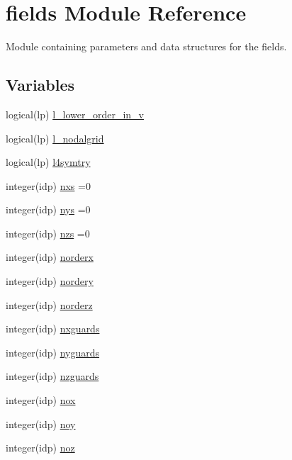 \hypertarget{namespacefields}{}\section{fields Module Reference}
\label{namespacefields}


Module containing parameters and data structures for the fields.  


\subsection*{Variables}
\begin{DoxyCompactItemize}
\item 
logical(lp) \hyperlink{namespacefields_a67f662f46bba94ac18562e7812803f57}{l\+\_\+lower\+\_\+order\+\_\+in\+\_\+v}
\item 
logical(lp) \hyperlink{namespacefields_a9ea1f27108bfb1c1e85280d56cf8ec3f}{l\+\_\+nodalgrid}
\item 
logical(lp) \hyperlink{namespacefields_a12122e98c83fda712ad6b5acfc9d8e0d}{l4symtry}
\item 
integer(idp) \hyperlink{namespacefields_a930a275ec3d0c2c725a19a016cf140f0}{nxs} =0
\item 
integer(idp) \hyperlink{namespacefields_adc125104f8f7666c683e307ad9703412}{nys} =0
\item 
integer(idp) \hyperlink{namespacefields_aa0a3c8b650acfd6add1cfe59383b4b0e}{nzs} =0
\item 
integer(idp) \hyperlink{namespacefields_a5db7070b5dbdeed3416e2ab8405978ef}{norderx}
\item 
integer(idp) \hyperlink{namespacefields_a9f1111bb7c59399b756f2fcb13db9285}{nordery}
\item 
integer(idp) \hyperlink{namespacefields_a1ed7522a1b4a7bc6460525f798d1619e}{norderz}
\item 
integer(idp) \hyperlink{namespacefields_a4ac76b76df65c6d646d63da6b1cd642c}{nxguards}
\item 
integer(idp) \hyperlink{namespacefields_ad86b91ec6fa696f154aebb594c867bf2}{nyguards}
\item 
integer(idp) \hyperlink{namespacefields_a08a746304a8f4b59076abee85eb82642}{nzguards}
\item 
integer(idp) \hyperlink{namespacefields_a9a721e4dba76280df41937c60a91e390}{nox}
\item 
integer(idp) \hyperlink{namespacefields_ae0f614311e278825c771b1b6fa3d0596}{noy}
\item 
integer(idp) \hyperlink{namespacefields_a30badcbccf6fb02a7301a38cb9d27eff}{noz}

\end{DoxyCompactItemize}
